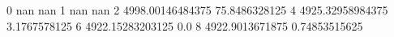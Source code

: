 0 nan nan
1 nan nan
2 4998.00146484375 75.8486328125
4 4925.32958984375 3.1767578125
6 4922.15283203125 0.0
8 4922.9013671875 0.74853515625
